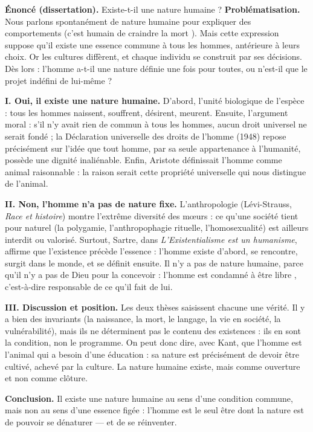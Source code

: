 \documentclass[11pt]{article}
\newcommand{\cle}[1]{{\popxbold\color{popdark}#1}}
\begin{document}
\begin{exoresolu}
\textbf{Énoncé (dissertation).} Existe-t-il une nature humaine ?
\tcblower
\textbf{Problématisation.} Nous parlons spontanément de \guillemotleft nature humaine \guillemotright pour expliquer des comportements (\guillemotleft c'est humain de craindre la mort \guillemotright). Mais cette expression suppose qu'il existe une essence commune à tous les hommes, antérieure à leurs choix. Or les cultures diffèrent, et chaque individu se construit par ses décisions. Dès lors : l'homme a-t-il une nature définie une fois pour toutes, ou n'est-il que le projet indéfini de lui-même ?

\textbf{I. Oui, il existe une nature humaine.} D'abord, l'unité biologique de l'espèce : tous les hommes naissent, souffrent, désirent, meurent. Ensuite, l'argument moral : s'il n'y avait rien de commun à tous les hommes, aucun droit universel ne serait fondé ; la Déclaration universelle des droits de l'homme (1948) repose précisément sur l'idée que tout homme, par sa seule appartenance à l'humanité, possède une dignité inaliénable. Enfin, Aristote définissait l'homme comme \guillemotleft animal raisonnable \guillemotright : la raison serait cette propriété universelle qui nous distingue de l'animal.

\textbf{II. Non, l'homme n'a pas de nature fixe.} L'anthropologie (Lévi-Strauss, \emph{Race et histoire}) montre l'extrême diversité des mœurs : ce qu'une société tient pour naturel (la polygamie, l'anthropophagie rituelle, l'homosexualité) est ailleurs interdit ou valorisé. Surtout, Sartre, dans \emph{L'Existentialisme est un humanisme}, affirme que \guillemotleft l'existence précède l'essence \guillemotright : l'homme existe d'abord, se rencontre, surgit dans le monde, et se définit ensuite. Il n'y a pas de nature humaine, parce qu'il n'y a pas de Dieu pour la concevoir : l'homme est \guillemotleft condamné à être libre \guillemotright, c'est-à-dire responsable de ce qu'il fait de lui.

\textbf{III. Discussion et position.} Les deux thèses saisissent chacune une vérité. Il y a bien des invariants (la naissance, la mort, le langage, la vie en société, la vulnérabilité), mais ils ne déterminent pas le contenu des existences : ils en sont la \cle{condition}, non le programme. On peut donc dire, avec Kant, que l'homme est l'animal qui a besoin d'une éducation : sa \guillemotleft nature \guillemotright est précisément de devoir être cultivé, achevé par la culture. La nature humaine existe, mais comme \cle{ouverture} et non comme clôture.

\textbf{Conclusion.} Il existe une nature humaine au sens d'une \cle{condition commune}, mais non au sens d'une \cle{essence figée} : l'homme est le seul être dont la nature est de pouvoir se \cle{dénaturer} — et de se réinventer.
\end{exoresolu}
\end{document}
